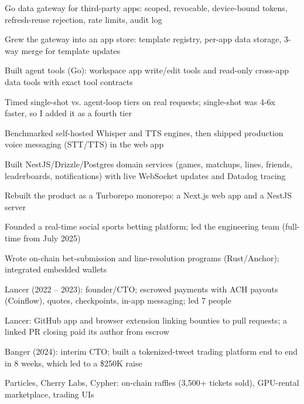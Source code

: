 \documentclass[print]{jack-resume}
\begin{document}
\begin{tightemize}
    \item Go data gateway for third-party apps: scoped, revocable, device-bound tokens, refresh-reuse rejection, rate limits, audit log
    \item Grew the gateway into an app store: template registry, per-app data storage, 3-way merge for template updates
    \item Built agent tools (Go): workspace app write/edit tools and read-only cross-app data tools with exact tool contracts
    \item Timed single-shot vs. agent-loop tiers on real requests; single-shot was 4-6x faster, so I added it as a fourth tier
    \item Benchmarked self-hosted Whisper and TTS engines, then shipped production voice messaging (STT/TTS) in the web app
\end{tightemize}
\sectionsep

\begin{tightemize}
    \item Built NestJS/Drizzle/Postgres domain services (games, matchups, lines, friends, leaderboards, notifications) with live WebSocket updates and Datadog tracing
    \item Rebuilt the product as a Turborepo monorepo: a Next.js web app and a NestJS server
    \item Founded a real-time social sports betting platform; led the engineering team (full-time from July 2025)
    \item Wrote on-chain bet-submission and line-resolution programs (Rust/Anchor); integrated embedded wallets
\end{tightemize}
\sectionsep

\begin{tightemize}
    \item Lancer (2022 -- 2023): founder/CTO; escrowed payments with ACH payouts (Coinflow), quotes, checkpoints, in-app messaging; led 7 people
    \item Lancer: GitHub app and browser extension linking bounties to pull requests; a linked PR closing paid its author from escrow
    \item Banger (2024): interim CTO; built a tokenized-tweet trading platform end to end in 8 weeks, which led to a \$250K raise
    \item Particles, Cherry Labs, Cypher: on-chain raffles (3,500+ tickets sold), GPU-rental marketplace, trading UIs
\end{tightemize}
\sectionsep
\end{document}
